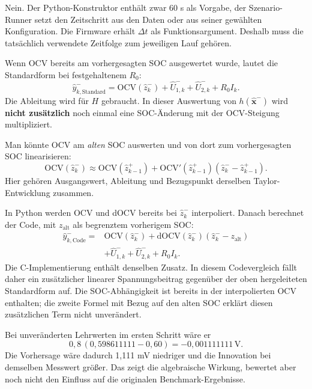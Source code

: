 Nein. Der Python-Konstruktor enthält zwar 60 s als Vorgabe, der Szenario-Runner setzt den Zeitschritt aus den Daten oder aus seiner gewählten Konfiguration. Die Firmware erhält $\Delta t$ als Funktionsargument. Deshalb muss die tatsächlich verwendete Zeitfolge zum jeweiligen Lauf gehören.

Wenn OCV bereits am vorhergesagten SOC ausgewertet wurde, lautet die Standardform bei festgehaltenem $R_0$:
\[
\hat y_{k,\mathrm{Standard}}^-=
\mathrm{OCV}(\hat z_k^-)+\hat U_{1,k}^-+\hat U_{2,k}^-+R_0I_k.
\]
Die Ableitung wird für $H$ gebraucht. In dieser Auswertung von $h(\hat{\mathbf x}^-)$ wird \textbf{nicht zusätzlich} noch einmal eine SOC-Änderung mit der OCV-Steigung multipliziert.

Man könnte OCV am \emph{alten} SOC auswerten und von dort zum vorhergesagten SOC linearisieren:
\[
\mathrm{OCV}(\hat z_k^-)
\approx\mathrm{OCV}(\hat z_{k-1}^+)
+\mathrm{OCV}'(\hat z_{k-1}^+)(\hat z_k^--\hat z_{k-1}^+).
\]
Hier gehören Ausgangswert, Ableitung und Bezugspunkt derselben Taylor-Entwicklung zusammen.

In Python werden OCV und dOCV bereits bei $\hat z_k^-$ interpoliert. Danach berechnet der Code, mit $z_{\mathrm{alt}}$ als begrenztem vorherigem SOC:
\[
\begin{aligned}
\hat y_{k,\mathrm{Code}}^-={}&\mathrm{OCV}(\hat z_k^-)
+\mathrm{dOCV}(\hat z_k^-)(\hat z_k^--z_{\mathrm{alt}})\\
&+\hat U_{1,k}^-+\hat U_{2,k}^-+R_0I_k.
\end{aligned}
\]
Die C-Implementierung enthält denselben Zusatz. In diesem Codevergleich fällt daher ein zusätzlicher linearer Spannungsbeitrag gegenüber der oben hergeleiteten Standardform auf. Die SOC-Abhängigkeit ist bereits in der interpolierten OCV enthalten; die zweite Formel mit Bezug auf den alten SOC erklärt diesen zusätzlichen Term nicht unverändert.

Bei unveränderten Lehrwerten im ersten Schritt wäre er
\[
0{,}8\,(0{,}598611111-0{,}60)=-0{,}001111111\,\mathrm V.
\]
Die Vorhersage wäre dadurch 1,111 mV niedriger und die Innovation bei demselben Messwert größer. Das zeigt die algebraische Wirkung, bewertet aber noch nicht den Einfluss auf die originalen Benchmark-Ergebnisse.

